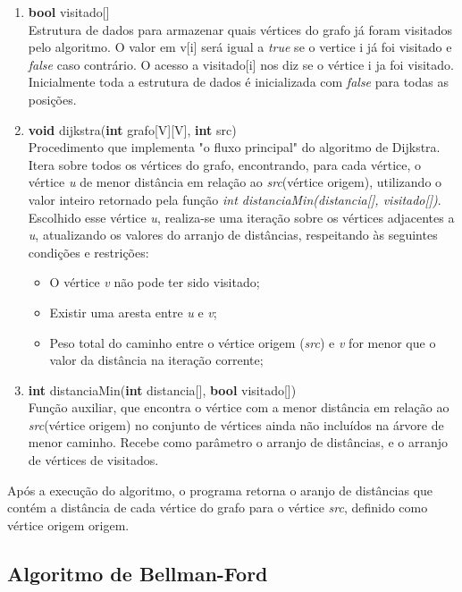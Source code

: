 \documentclass[12pt]{article}
\begin{document}
\begin{enumerate}
\item \textbf{bool} visitado[]
\\
Estrutura de dados para armazenar quais vértices do grafo já foram visitados pelo algoritmo. O valor em v[i] será igual a \textit{true} se o vertice i já foi visitado e \textit{false} caso contrário. O acesso a visitado[i]  nos diz se o vértice i ja foi visitado. Inicialmente toda a estrutura de dados é  inicializada com \textit{false} para todas as posições.
\\
\item \textbf{void} dijkstra(\textbf{int} grafo[V][V], \textbf{int} src)
\\Procedimento  que implementa  "o fluxo  principal" do algoritmo de Dijkstra. Itera sobre todos os vértices do grafo, encontrando, para cada vértice, o vértice \textit{u} de menor distância em relação ao \textit{src}(vértice origem), utilizando o valor inteiro retornado pela    função \textit{int distanciaMin(distancia[], visitado[])}. Escolhido esse vértice \textit{u}, realiza-se uma iteração sobre os vértices adjacentes a \textit{u}, atualizando os valores do arranjo de distâncias, respeitando às seguintes condições e restrições:
\begin{itemize}
\item O vértice \textit{v} não pode ter sido visitado;
\item Existir uma aresta entre \textit{u} e \textit{v};
\item Peso total do caminho entre o vértice origem (\textit{src}) e \textit{v} for menor que o valor da distância na iteração corrente;
\end{itemize}
\item \textbf{int} distanciaMin(\textbf{int} distancia[], \textbf{bool} visitado[])
\\
Função auxiliar, que encontra o vértice com a menor distância em relação ao \textit{src}(vértice origem)  no conjunto de vértices ainda não incluídos na árvore de menor caminho. Recebe como parâmetro o arranjo de distâncias, e o arranjo de vértices  de visitados.
\end{enumerate}

Após  a  execução do algoritmo, o programa retorna o aranjo de distâncias que contém a distância de cada vértice do grafo  para o vértice \textit{src}, definido como vértice origem  origem.


\subsection{Algoritmo de Bellman-Ford}\label{sec:bellman-ford}
\end{document}
